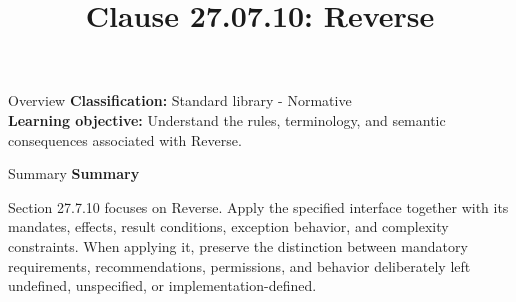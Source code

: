 \documentclass[10pt,letterpaper]{article}
\title{Clause 27.07.10: Reverse}
\author{}
\date{}
\begin{document}
\maketitle
\begin{CornellOverviewBox}{Overview}
\textbf{Classification:} Standard library - Normative\\[2pt]
\textbf{Learning objective:} Understand the rules, terminology, and semantic consequences associated with Reverse.
\end{CornellOverviewBox}\begin{CornellSummaryBox}{Summary}
{\sffamily\bfseries\color{Accent} Summary}\par\vspace{3pt}Section 27.7.10 focuses on Reverse. Apply the specified interface together with its mandates, effects, result conditions, exception behavior, and complexity constraints. When applying it, preserve the distinction between mandatory requirements, recommendations, permissions, and behavior deliberately left undefined, unspecified, or implementation-defined.
\end{CornellSummaryBox}
\end{document}
